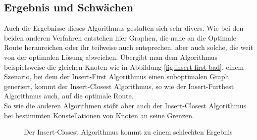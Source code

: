 \subsection{Ergebnis und Schwächen}
Auch die Ergebnisse dieses Algorithmus gestalten sich sehr divers.
Wie bei den beiden anderen Verfahren entstehen hier Graphen, die nahe an die Optimale Route heranreichen oder ihr teilweise auch entsprechen, aber auch solche, die weit von der optimalen Lösung abweichen.
Übergibt man dem Algorithmus beispielsweise die gleichen Knoten wie in Abbildung \vref{fig:insert-first-bad}, einem Szenario, bei dem der Insert-First Algorithmus einen suboptimalen Graph generiert, kommt der Insert-Closest Algorithmus, so wie der Insert-Furthest Algorithmus auch, auf die optimale Route.\\
So wie die anderen Algorithmen stößt aber auch der Insert-Closest Algorithmus bei bestimmten Konstellationen von Knoten an seine Grenzen.

\begin{figure}
    \begin{center}
        \hfil
        \caption{Der Insert-Closest Algorithmus kommt zu einem schlechten Ergebnis}
        \label{fig:insert-closest-BAD}
    \end{center}
\end{figure}

